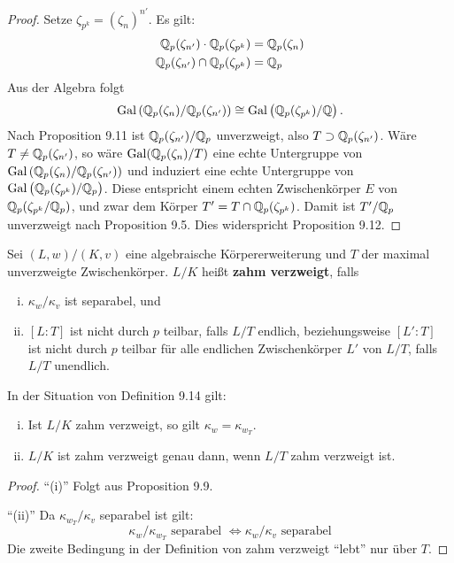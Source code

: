 \begin{proof}
	Setze $\zeta_{p^k} = (\zeta_n)^{n'}$. Es gilt:
	\begin{align*}
	\mathbb{Q}_p(\zeta_{n'}) \cdot \mathbb{Q}_p(\zeta_{p^k}) &= \mathbb{Q}_p(\zeta_n) \\
	\mathbb{Q}_p(\zeta_{n'}) \cap \mathbb{Q}_p(\zeta_{p^k}) &= \mathbb{Q}_p
	\end{align*}
	Aus der Algebra folgt
	\begin{align*}
	\operatorname{Gal}\left( \mathbb{Q}_p(\zeta_n) / \mathbb{Q}_p(\zeta_{n'}) \right)
	\cong \operatorname{Gal}\left( \mathbb{Q}_p(\zeta_{p^k}) / \mathbb{Q} \right).
	\end{align*}
	Nach Proposition 9.11 ist $\mathbb{Q}_p(\zeta_{n'}) / \mathbb{Q}_p$ unverzweigt, also $T\supset \mathbb{Q}_p(\zeta_{n'})$.
	Wäre $T \neq \mathbb{Q}_p(\zeta_{n'})$, so wäre $\operatorname{Gal}(\mathbb{Q}_p(\zeta_n)/T)$ eine echte Untergruppe von $\operatorname{Gal}\left( \mathbb{Q}_p(\zeta_n) / \mathbb{Q}_p(\zeta_{n'})  \right)$ und induziert eine echte Untergruppe von $\operatorname{Gal}\left( \mathbb{Q}_p(\zeta_{p^k}) / \mathbb{Q}_p \right)$. Diese entspricht einem echten Zwischenkörper $E$ von $\mathbb{Q}_p(\zeta_{p^k} / \mathbb{Q}_p)$, und zwar dem Körper $T' = T \cap \mathbb{Q}_p(\zeta_{p^k})$. Damit ist $T'/\mathbb{Q}_p$ unverzweigt nach Proposition 9.5.
	Dies widerspricht Proposition 9.12.
\end{proof}

\begin{defi}
	Sei $(L,w)/(K,v)$ eine algebraische Körpererweiterung und $T$ der maximal unverzweigte Zwischenkörper. $L/K$ heißt \textbf{zahm verzweigt}, falls
	\begin{enumerate}[(i)]
		\item $\kappa_w/\kappa_v$ ist separabel, und
		\item $[L:T]$ ist nicht durch $p$ teilbar, falls $L/T$ endlich, beziehungsweise
		$[L':T]$ ist nicht durch $p$ teilbar für alle endlichen Zwischenkörper $L'$ von $L/T$,
		falls $L/T$ unendlich.
	\end{enumerate}
\end{defi}


\begin{Bem}
	In der Situation von Definition 9.14 gilt:
	\begin{enumerate}[(i)]
		\item Ist $L/K$ zahm verzweigt, so gilt $\kappa_w=\kappa_{w_T}$.
		\item $L/K$ ist zahm verzweigt genau dann, wenn $L/T$ zahm verzweigt ist.
	\end{enumerate}
\end{Bem}

\begin{proof}
	\enquote{(i)} Folgt aus Proposition 9.9.
	
	\bigskip \enquote{(ii)} Da $\kappa_{w_T} / \kappa_v$ separabel ist gilt:
	\[ \kappa_w / \kappa_{w_T} \text{ separabel } \Leftrightarrow \kappa_w / \kappa_v \text{ separabel}
	\]
	Die zweite Bedingung in der Definition von zahm verzweigt \enquote{lebt} nur über $T$.
\end{proof}

